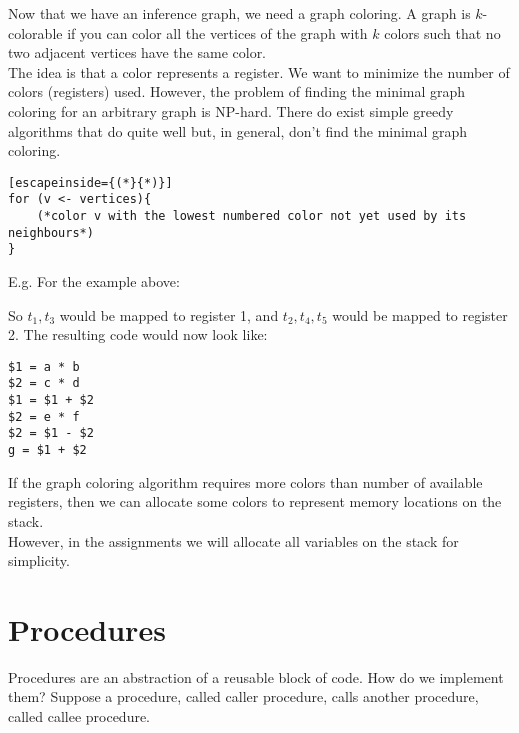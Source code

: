 \documentclass[12pt, letterpaper]{article}
\begin{document}
Now that we have an inference graph, we need a graph coloring. A graph is \(k\)-colorable if you can color all the vertices of the graph with \(k\) colors such that no two adjacent vertices have the same color.\\

The idea is that a color represents a register. We want to minimize the number of colors (registers) used. However, the problem of finding the minimal graph coloring for an arbitrary graph is NP-hard. There do exist simple greedy algorithms that do quite well but, in general, don't find the minimal graph coloring.\\

\begin{lstlisting}[escapeinside={(*}{*)}]
for (v <- vertices){
	(*color v with the lowest numbered color not yet used by its neighbours*)
}
\end{lstlisting}

E.g. For the example above:
\begin{center}
\end{center}

So \(t_1, t_3\) would be mapped to register 1, and \(t_2, t_4, t_5\) would be mapped to register 2.
The resulting code would now look like:

\begin{lstlisting}
$1 = a * b
$2 = c * d
$1 = $1 + $2
$2 = e * f
$2 = $1 - $2
g = $1 + $2
\end{lstlisting}

If the graph coloring algorithm requires more colors than number of available registers, then we can allocate some colors to represent memory locations on the stack.\\

However, in the assignments we will allocate all variables on the stack for simplicity.

\section{Procedures}
Procedures are an abstraction of a reusable block of code. How do we implement them? Suppose a procedure, called caller procedure, calls another procedure, called callee procedure.\\
\end{document}
